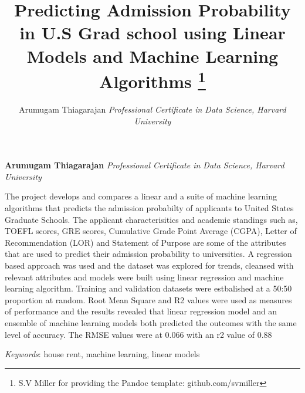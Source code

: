 \documentclass[11pt,]{article}
\title{Predicting Admission Probability in U.S Grad school using Linear Models
and Machine Learning Algorithms \thanks{S.V Miller for providing the Pandoc template: github.com/svmiller}  }
\author{\Large Arumugam Thiagarajan\vspace{0.05in} \newline\normalsize\emph{Professional Certificate in Data Science, Harvard University}  }
\date{}
\newcommand*{\authorfont}{\fontfamily{phv}\selectfont}
\renewenvironment{abstract}
 {{%
    \setlength{\leftmargin}{0mm}
    \setlength{\rightmargin}{\leftmargin}%
  }%
  \relax}
 {\endlist}
\begin{document}
	
%

{%
\setlength{\parindent}{0pt}
\thispagestyle{plain}
{\fontsize{18}{20}\selectfont\raggedright 
\maketitle  %

}

{
   \vskip 13.5pt\relax \normalsize\fontsize{11}{12} 
\textbf{\authorfont Arumugam Thiagarajan} \hskip 15pt \emph{\small Professional Certificate in Data Science, Harvard University}   

}

}








\begin{abstract}

    \hbox{\vrule height .2pt width 39.14pc}

    \vskip 8.5pt %

\noindent The project develops and compares a linear and a suite of machine
learning algorithms that predicts the admission probabilty of applicants
to United States Graduate Schools. The applicant characterisitics and
academic standings such as, TOEFL scores, GRE scores, Cumulative Grade
Point Average (CGPA), Letter of Recommendation (LOR) and Statement of
Purpose are some of the attributes that are used to predict their
admission probability to universities. A regression based approach was
used and the dataset was explored for trends, cleansed with relevant
attributes and models were built using linear regression and machine
learning algorithm. Training and validation datasets were estbalished at
a 50:50 proportion at random. Root Mean Square and R2 values were used
as measures of performance and the results revealed that linear
regression model and an ensemble of machine learning models both
predicted the outcomes with the same level of accuracy. The RMSE values
were at 0.066 with an r2 value of 0.88


\vskip 8.5pt \noindent \emph{Keywords}: house rent, machine learning, linear models \par

    \hbox{\vrule height .2pt width 39.14pc}



\end{abstract}
\end{document}
